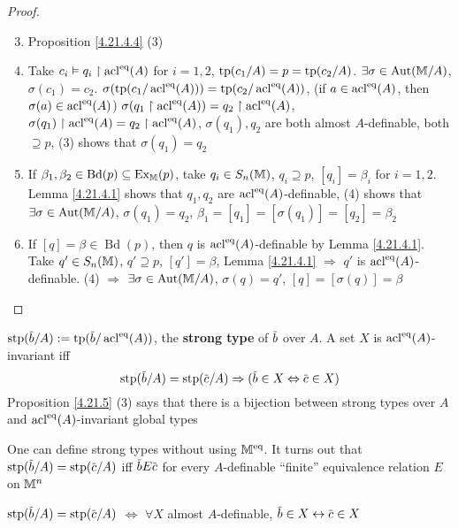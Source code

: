 \documentclass[11pt]{article}
\DeclareMathOperator{\Ex}{Ex}
\DeclareMathOperator{\Bd}{Bd}
\begin{document}
\begin{proof}
\begin{enumerate}
\setcounter{enumi}{2}
\item Proposition \ref{4.21.4.4} (3)
\item Take \(c_i\vDash q_i\upharpoonright\operatorname{acl}^{\operatorname{eq}}(A)\)
for \(i=1,2\), \(\operatorname{tp}(c_1/A)=p=\operatorname{tp}(c_2/A)\). \(\exists\sigma\in\operatorname{\text{Aut}}(\mathbb{M}/A)\), \(\sigma(c_1)=c_2\).
\(\sigma(\operatorname{tp}(c_1/\operatorname{acl}^{\operatorname{eq}}(A)))=\operatorname{tp}(c_2/\operatorname{acl}^{\operatorname{eq}}(A))\),
(if \(a\in\operatorname{acl}^{\operatorname{eq}}(A)\), then \(\sigma(a)\in\operatorname{acl}^{\operatorname{eq}}(A)\))
\(\sigma(q_1\upharpoonright\operatorname{acl}^{\operatorname{eq}}(A))=q_2\upharpoonright\operatorname{acl}^{\operatorname{eq}}(A)\),
\(\sigma(q_1)\upharpoonright\operatorname{acl}^{\operatorname{eq}}(A)=q_2\upharpoonright\operatorname{acl}^{\operatorname{eq}}(A)\),
\(\sigma(q_1),q_2\) are both almost \(A\)-definable, both \(\supseteq p\), (3) shows that \(\sigma(q_1)=q_2\)
\setcounter{enumi}{0}
\item If \(\beta_1,\beta_2\in\Bd(p)\subseteq\Ex_{\M}(p)\), take \(q_i\in S_n(\mathbb{M})\), \(q_i\supseteq p\), \([q_i]=\beta_i\)
for \(i=1,2\). Lemma \ref{4.21.4.1} shows that \(q_1,q_2\) are \(\operatorname{acl}^{\operatorname{eq}}(A)\)-definable, (4)
shows that \(\exists\sigma\in\operatorname{\text{Aut}}(\mathbb{M}/A)\), \(\sigma(q_1)=q_2\), \(\beta_1=[q_1]=[\sigma(q_1)]=[q_2]=\beta_2\)
\item If \([q]=\beta\in\Bd(p)\), then \(q\) is \(\operatorname{acl}^{\operatorname{eq}}(A)\)-definable by Lemma \ref{4.21.4.1}.
Take \(q'\in S_n(\mathbb{M})\), \(q'\supseteq p\), \([q']=\beta\), Lemma \ref{4.21.4.1} \(\Rightarrow\) \(q'\)
is \(\operatorname{acl}^{\operatorname{eq}}(A)\)-definable. (4) \(\Rightarrow\) \(\exists\sigma\in\operatorname{\text{Aut}}(\mathbb{M}/A)\), \(\sigma(q)=q'\), \([q]=[\sigma(q)]=\beta\)
\end{enumerate}
\end{proof}

\begin{remark}
\label{4.21.4.6}
\(\stp(\barb/A):=\tp(\barb/\acl^{\eq}(A))\), the \textbf{strong type} of \(\barb\) over \(A\). A
set \(X\) is \(\operatorname{acl}^{\operatorname{eq}}(A)\)-invariant iff
\begin{equation*}
\stp(\barb/A)=\stp(\barc/A)\Rightarrow(\barb\in X\Leftrightarrow\barc\in X)
\end{equation*}
Proposition \ref{4.21.5} (3) says that there is a bijection between strong types over \(A\)
and \(\operatorname{acl}^{\operatorname{eq}}(A)\)-invariant global types

One can define strong types without using \(\mathbb{M}^{\operatorname{eq}}\). It turns out
that \(\stp(\barb/A)=\stp(\barc/A)\) iff \(\barb E\barc\) for every \(A\)-definable ``finite''
equivalence relation \(E\) on \(\mathbb{M}^n\)

\(\stp(\barb/A)=\stp(\barc/A)\) \(\Leftrightarrow\) \(\forall X\) almost \(A\)-definable, \(\barb\in X\leftrightarrow\barc\in X\)
\end{remark}
\end{document}
